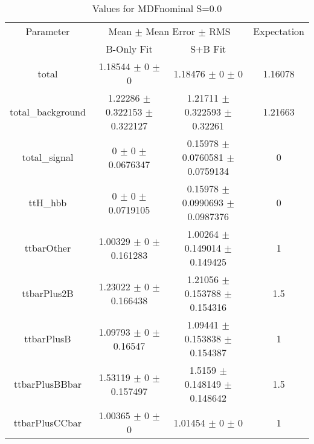 \begin{table}
\centering
\caption{Values for MDFnominal S=0.0}
\begin{tabular}{cccc}
\toprule
Parameter & \multicolumn{2}{c}{Mean $\pm$ Mean Error $\pm$ RMS} & Expectation\\
 & B-Only Fit & S+B Fit & \\
\midrule
total & \num{1.18544} $\pm$ \num{0} $\pm$ \num{0} & \num{1.18476} $\pm$ \num{0} $\pm$ \num{0} & \num{1.16078}\\
total\_background & \num{1.22286} $\pm$ \num{0.322153} $\pm$ \num{0.322127} & \num{1.21711} $\pm$ \num{0.322593} $\pm$ \num{0.32261} & \num{1.21663}\\
total\_signal & \num{0} $\pm$ \num{0} $\pm$ \num{0.0676347} & \num{0.15978} $\pm$ \num{0.0760581} $\pm$ \num{0.0759134} & \num{0}\\
ttH\_hbb & \num{0} $\pm$ \num{0} $\pm$ \num{0.0719105} & \num{0.15978} $\pm$ \num{0.0990693} $\pm$ \num{0.0987376} & \num{0}\\
ttbarOther & \num{1.00329} $\pm$ \num{0} $\pm$ \num{0.161283} & \num{1.00264} $\pm$ \num{0.149014} $\pm$ \num{0.149425} & \num{1}\\
ttbarPlus2B & \num{1.23022} $\pm$ \num{0} $\pm$ \num{0.166438} & \num{1.21056} $\pm$ \num{0.153788} $\pm$ \num{0.154316} & \num{1.5}\\
ttbarPlusB & \num{1.09793} $\pm$ \num{0} $\pm$ \num{0.16547} & \num{1.09441} $\pm$ \num{0.153838} $\pm$ \num{0.154387} & \num{1}\\
ttbarPlusBBbar & \num{1.53119} $\pm$ \num{0} $\pm$ \num{0.157497} & \num{1.5159} $\pm$ \num{0.148149} $\pm$ \num{0.148642} & \num{1.5}\\
ttbarPlusCCbar & \num{1.00365} $\pm$ \num{0} $\pm$ \num{0} & \num{1.01454} $\pm$ \num{0} $\pm$ \num{0} & \num{1}\\
\bottomrule
\end{tabular}
\end{table}